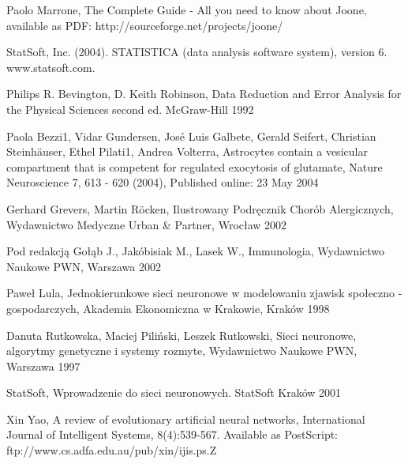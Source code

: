 \documentclass[10pt,oneside]{memoir}
\def\mybibliostyle{plain}
\def\bibliocommand{}
\begin{document}
\begin{thebibliography}{0}
Paolo Marrone, The Complete Guide - All you need to know about Joone, available as  PDF: http://sourceforge.net/projects/joone/

StatSoft, Inc. (2004). STATISTICA (data analysis software system), version 6. www.statsoft.com.

Philips R. Bevington, D. Keith Robinson, Data Reduction and Error Analysis for the Physical Sciences second ed. McGraw-Hill 1992

Paola Bezzi1, Vidar Gundersen, José Luis Galbete, Gerald Seifert, Christian Steinhäuser, Ethel Pilati1, Andrea Volterra, Astrocytes contain a vesicular compartment that is competent for regulated exocytosis of glutamate, Nature Neuroscience 7, 613 - 620 (2004), Published online: 23 May 2004

Gerhard Grevers, Martin Röcken, Ilustrowany Podręcznik Chorób Alergicznych, Wydawnictwo Medyczne Urban \& Partner, Wrocław 2002

Pod redakcją Gołąb J., Jakóbisiak M., Lasek W., Immunologia, Wydawnictwo Naukowe PWN, Warszawa 2002

Paweł Lula, Jednokierunkowe sieci neuronowe w modelowaniu zjawisk społeczno - gospodarczych, Akademia Ekonomiczna w Krakowie, Kraków 1998

Danuta Rutkowska, Maciej Piliński, Leszek Rutkowski, Sieci neuronowe, algorytmy genetyczne i systemy rozmyte, Wydawnictwo Naukowe PWN, Warszawa 1997

StatSoft, Wprowadzenie do sieci neuronowych. StatSoft Kraków 2001

Xin Yao, A review of evolutionary artificial neural networks, International Journal of Intelligent Systems,  8(4):539-567. Available as PostScript: ftp://www.cs.adfa.edu.au/pub/xin/ijis.ps.Z
		
\end{thebibliography}
		
%
%

\backmatter


\bibliocommand

\printglossary


\printindex
\end{document}
